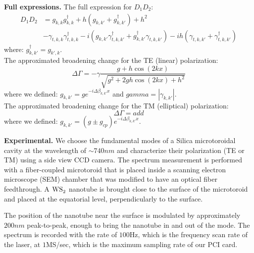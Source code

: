 \documentclass[journal=jacsat,manuscript=article]{achemso}
\begin{document}
\begin{suppinfo}

\textbf{Full expressions.}
The full expression for $D_1D_2$:
\begin{align*}
D_1D_2 &= g_{k,k}g_{k,k}^{\dagger} + h \left( g_{k,k'} + g_{k,k'}^{\dagger} \right) + h^2 \\ &-\gamma_{t,k,k}\gamma_{t,k,k}^{\dagger} - i\left( g_{k,k'}\gamma_{t,k,k'}^{\dagger} + g_{k,k'}^{\dagger}\gamma_{t,k,k'}\right) - ih \left( \gamma_{t,k,k'} + \gamma_{t,k,k'}^{\dagger}\right)
\end{align*}
where: $g_{k,k'}^{\dagger} = g_{k',k}$.\\
The approximated broadening change for the TE (linear) polarization:
\begin{equation*}
\Delta \Gamma = -\gamma \frac{g + h \cos{\left( 2 k x \right)}}{\sqrt{g^2 + 2gh\cos{\left( 2 k x \right)} + h^2}}
\end{equation*}
where we defined: $g_{k,k'} = g e^{-i \Delta \beta_{k,k'} x}$ and $gamma = \left| \gamma_{k,k'} \right|$.\\
The approximated broadening change for the TM (elliptical) polarization:
\begin{equation*}
\Delta \Gamma = add
\end{equation*}
where we defined: $g_{k,k'} = \left(g \pm g_{cp} \right) e^{-i \Delta \beta_{k,k'} x}$.

\textbf{Experimental.} We choose the fundamental modes of a Silica microtoroidal cavity at the wavelength of $\sim740nm$ and characterize their polarization (TE or TM) using a side view CCD camera.
The spectrum measurement is performed with a fiber-coupled microtoroid that is placed inside a scanning electron microscope (SEM) chamber that was modified to have an optical fiber feedthrough. A $\ce{WS_2}$ nanotube is brought close to the surface of the microtoroid and placed at the equatorial level, perpendicularly to the surface.

The position of the nanotube near the surface is modulated by approximately $200nm$ peak-to-peak, enough to bring the nanotube in and out of the mode. The spectrum is recorded with the rate of $100$Hz, which is the frequency scan rate of the laser, at $1$MS/sec, which is the maximum sampling rate of our PCI card.


\end{suppinfo}
\end{document}
